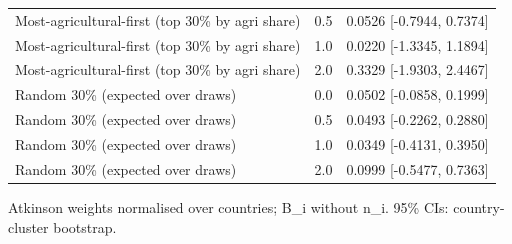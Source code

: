 \begin{table}[htbp]
\begin{tabular}{llr}
Most-agricultural-first (top 30\% by agri share) & 0.5 & 0.0526 [-0.7944, 0.7374] \\
Most-agricultural-first (top 30\% by agri share) & 1.0 & 0.0220 [-1.3345, 1.1894] \\
Most-agricultural-first (top 30\% by agri share) & 2.0 & 0.3329 [-1.9303, 2.4467] \\
Random 30\% (expected over draws) & 0.0 & 0.0502 [-0.0858, 0.1999] \\
Random 30\% (expected over draws) & 0.5 & 0.0493 [-0.2262, 0.2880] \\
Random 30\% (expected over draws) & 1.0 & 0.0349 [-0.4131, 0.3950] \\
Random 30\% (expected over draws) & 2.0 & 0.0999 [-0.5477, 0.7363] \\
\bottomrule
\end{tabular}
\par\smallskip\footnotesize Atkinson weights normalised over countries; B\_i without n\_i. 95\% CIs: country-cluster bootstrap.
\end{table}
